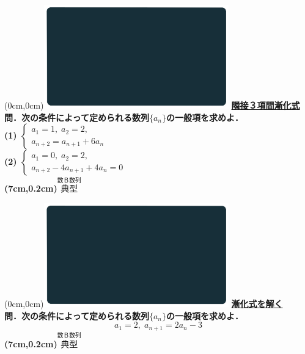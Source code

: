 \documentclass[10pt,
fleqn,
dvipdfmx,
uplatex
]{jsarticle}
\begin{document}
\newpage



\at(0cm,0cm){\includegraphics[width=8cm,bb=0 0 1920 1080]{./media_local/smart_background/数B数列.jpeg}}
{\color{orange}\bf\boldmath\Large\underline{隣接３項間漸化式}}\vspace{0.3zw}\\
\normalsize 
\bf\boldmath 問．次の条件によって定められる数列$\{a_n\}$の一般項を求めよ．\\
(1)  $\left\{\begin{array}{l}a_1=1,\;a_2=2,\;\\a_{n+2}=a_{n+1}+6a_n\end{array}\right.$\\
(2)  $\left\{\begin{array}{l}a_1=0,\;a_2=2,\;\\a_{n+2}-4a_{n+1}+4a_n=0\end{array}\right.$\\

\at(7cm,0.2cm){\small\color{bradorange}$\overset{\text{数Ｂ数列}}{\text{典型}}$}


\newpage



\at(0cm,0cm){\includegraphics[width=8cm,bb=0 0 1920 1080]{./media_local/smart_background/数B数列.jpeg}}
{\color{orange}\bf\boldmath\Large\underline{漸化式を解く}}\vspace{0.3zw}\\
\large 
\bf\boldmath 問．次の条件によって定められる数列$\{a_n\}$の一般項を求めよ．
\[a_1=2,\;a_{n+1}=2a_n-3\]
\at(7cm,0.2cm){\small\color{bradorange}$\overset{\text{数Ｂ数列}}{\text{典型}}$}
\end{document}
